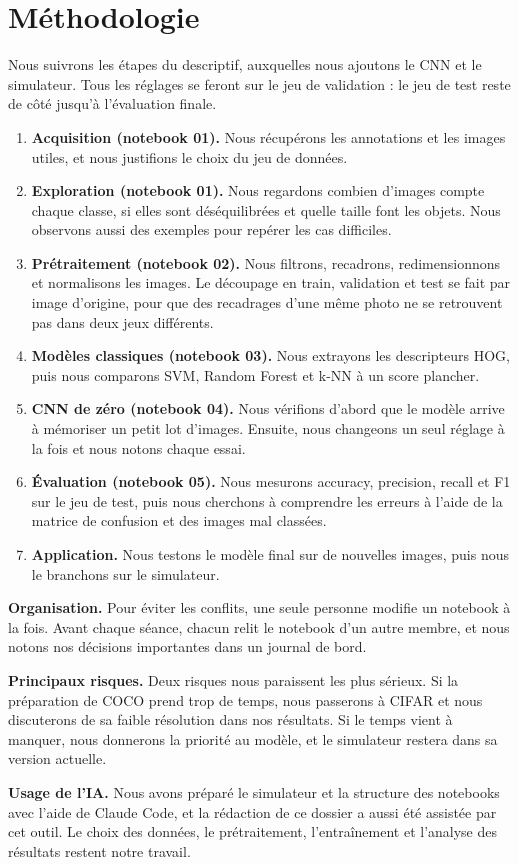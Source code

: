 \section{Méthodologie}
\label{sec:methodologie}

Nous suivrons les étapes du descriptif, auxquelles nous ajoutons le CNN et le simulateur. Tous les réglages se feront sur le jeu de validation : le jeu de test reste de côté jusqu'à l'évaluation finale.

\begin{enumerate}
  \item \textbf{Acquisition (notebook 01).} Nous récupérons les annotations et les images utiles, et nous justifions le choix du jeu de données.
  \item \textbf{Exploration (notebook 01).} Nous regardons combien d'images compte chaque classe, si elles sont déséquilibrées et quelle taille font les objets. Nous observons aussi des exemples pour repérer les cas difficiles.
  \item \textbf{Prétraitement (notebook 02).} Nous filtrons, recadrons, redimensionnons et normalisons les images. Le découpage en train, validation et test se fait par image d'origine, pour que des recadrages d'une même photo ne se retrouvent pas dans deux jeux différents.
  \item \textbf{Modèles classiques (notebook 03).} Nous extrayons les descripteurs HOG, puis nous comparons SVM, Random Forest et k-NN à un score plancher.
  \item \textbf{CNN de zéro (notebook 04).} Nous vérifions d'abord que le modèle arrive à mémoriser un petit lot d'images. Ensuite, nous changeons un seul réglage à la fois et nous notons chaque essai.
  \item \textbf{Évaluation (notebook 05).} Nous mesurons accuracy, precision, recall et F1 sur le jeu de test, puis nous cherchons à comprendre les erreurs à l'aide de la matrice de confusion et des images mal classées.
  \item \textbf{Application.} Nous testons le modèle final sur de nouvelles images, puis nous le branchons sur le simulateur.
\end{enumerate}

\textbf{Organisation.} Pour éviter les conflits, une seule personne modifie un notebook à la fois. Avant chaque séance, chacun relit le notebook d'un autre membre, et nous notons nos décisions importantes dans un journal de bord.

\textbf{Principaux risques.} Deux risques nous paraissent les plus sérieux. Si la préparation de COCO prend trop de temps, nous passerons à CIFAR et nous discuterons de sa faible résolution dans nos résultats. Si le temps vient à manquer, nous donnerons la priorité au modèle, et le simulateur restera dans sa version actuelle.

\textbf{Usage de l'IA.} Nous avons préparé le simulateur et la structure des notebooks avec l'aide de Claude Code, et la rédaction de ce dossier a aussi été assistée par cet outil. Le choix des données, le prétraitement, l'entraînement et l'analyse des résultats restent notre travail.
